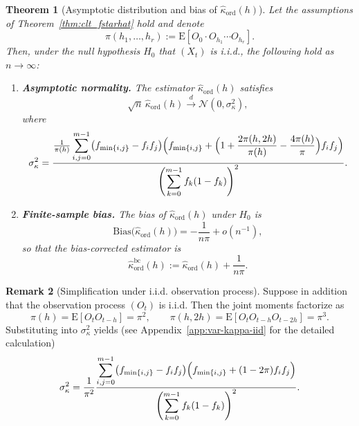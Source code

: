 ﻿\documentclass[12pt,a4paper]{scrreprt}
\newtheorem{theorem}{Theorem}[chapter]
\theoremstyle{definition}
\newtheorem{remark}[theorem]{Remark}
\begin{document}
\begin{theorem}[Asymptotic distribution and bias of 
$\hat{\kappa}_{\mathrm{ord}}(h)$]
\label{thm:kappa-asymp}
Let the assumptions of Theorem~\ref{thm:clt_fstarhat} hold and denote
\[
    \pi(h_1,\ldots,h_r) := \mathrm{E}[O_0\cdot O_{h_1}\cdots O_{h_r}].
\]
Then, under the null hypothesis $H_0$ that $(X_t)$ is i.i.d., the 
following hold as $n\to\infty$:
\begin{enumerate}
    \item \textbf{Asymptotic normality.} The estimator 
    $\hat{\kappa}_{\mathrm{ord}}(h)$ satisfies
    \[
        \sqrt{n}\,\hat{\kappa}_{\mathrm{ord}}(h) 
        \xrightarrow{d} \mathcal{N}(0,\sigma^2_\kappa),
    \]
    where
    \[
        \sigma^2_\kappa =
        \frac{
            \frac{1}{\pi(h)}\displaystyle\sum_{i,j=0}^{m-1}
            \bigl(f_{\min\{i,j\}}-f_if_j\bigr)
            \Bigl(f_{\min\{i,j\}} 
            + \Bigl(1+\frac{2\pi(h,2h)}{\pi(h)} 
            - \frac{4\pi(h)}{\pi}\Bigr)f_if_j\Bigr)
        }{
            \left(\displaystyle\sum_{k=0}^{m-1}f_k(1-f_k)\right)^2
        }.
    \]
    \item \textbf{Finite-sample bias.} The bias of 
    $\hat{\kappa}_{\mathrm{ord}}(h)$ under $H_0$ is
    \[
        \mathrm{Bias}\bigl(\hat{\kappa}_{\mathrm{ord}}(h)\bigr) 
        = -\frac{1}{n \pi}+ o(n^{-1}),
    \]
    so that the bias-corrected estimator is
    \[
        \hat{\kappa}^{\mathrm{bc}}_{\mathrm{ord}}(h) 
        := \hat{\kappa}_{\mathrm{ord}}(h) + \frac{1}{n\pi}.
    \]
\end{enumerate}
\end{theorem}

\begin{remark}[Simplification under i.i.d. observation process]
\label{rem:iid_Ot}
Suppose in addition that the observation process $(O_t)$ is
i.i.d. Then the joint moments factorize as
\[
    \pi(h) = \mathrm{E}[O_t O_{t-h}] = \pi^2,
    \qquad
    \pi(h,2h) = \mathrm{E}[O_t O_{t-h} O_{t-2h}] = \pi^3.
\]
Substituting into $\sigma^2_\kappa$ yields (see Appendix~\ref{app:var-kappa-iid} for the detailed calculation)
\[
    \sigma^2_\kappa =
    \frac{1}{\pi^2}\frac{
        \displaystyle\sum_{i,j=0}^{m-1}
        \bigl(f_{\min\{i,j\}}-f_if_j\bigr)
        \Bigl(f_{\min\{i,j\}} 
        + (1-2\pi)f_if_j\Bigr)
    }{
        \left(\displaystyle\sum_{k=0}^{m-1}f_k(1-f_k)\right)^2
    }.
\]
\end{remark}
\end{document}
